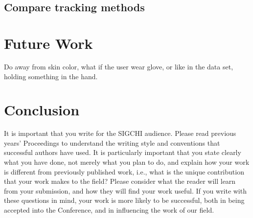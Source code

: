 \documentclass{sigchi}
\begin{document}
\subsection{Compare tracking methods}

\section{Future Work}
Do away from skin color, what if the user wear glove, or like in the data set,
holding something in the hand.

\section{Conclusion}

It is important that you write for the SIGCHI audience.  Please read
previous years' Proceedings to understand the writing style and
conventions that successful authors have used.  It is particularly
important that you state clearly what you have done, not merely what
you plan to do, and explain how your work is different from previously
published work, i.e., what is the unique contribution that your work
makes to the field?  Please consider what the reader will learn from
your submission, and how they will find your work useful.  If you
write with these questions in mind, your work is more likely to be
successful, both in being accepted into the Conference, and in
influencing the work of our field.

%
%
%
%
%
\balance



\end{document}
